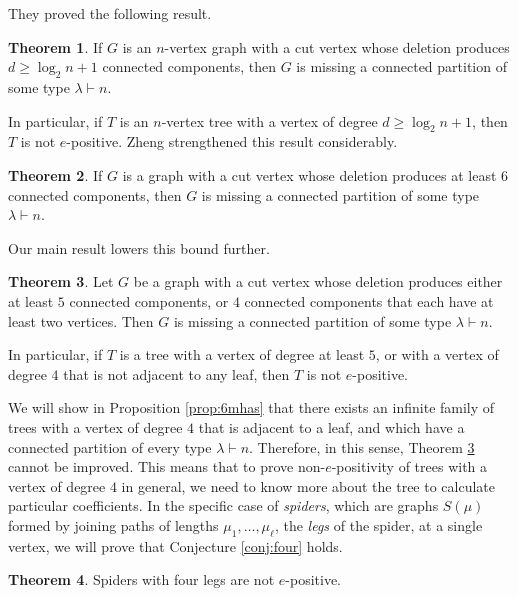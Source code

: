 \documentclass[12pt]{amsart}  %
\theoremstyle{definition}
\newtheorem{theorem}{Theorem}[section]
\theoremstyle{remark}
\numberwithin{equation}{section}
\begin{document}
They proved the following result. 

\begin{theorem}\cite[Theorem 4.1]{chromspostrees} If $G$ is an $n$-vertex graph with a cut vertex whose deletion produces $d\geq\log_2 n+1$ connected components, then $G$ is missing a connected partition of some type $\lambda\vdash n$.
\end{theorem}

In particular, if $T$ is an $n$-vertex tree with a vertex of degree $d\geq\log_2n+1$, then $T$ is not $e$-positive. Zheng strengthened this result considerably.

\begin{theorem}\cite[Theorem 3.13]{spiderepos} If $G$ is a graph with a cut vertex whose deletion produces at least $6$ connected components, then $G$ is missing a connected partition of some type $\lambda\vdash n$.
\end{theorem}

Our main result lowers this bound further.

\begin{theorem}\label{thm:main}
Let $G$ be a graph with a cut vertex whose deletion produces either at least $5$ connected components, or $4$ connected components that each have at least two vertices. Then $G$ is missing a connected partition of some type $\lambda\vdash n$.
\end{theorem}

In particular, if $T$ is a tree with a vertex of degree at least $5$, or with a vertex of degree $4$ that is not adjacent to any leaf, then $T$ is not $e$-positive.

We will show in Proposition \ref{prop:6mhas} that there exists an infinite family of trees with a vertex of degree $4$ that is adjacent to a leaf, and which have a connected partition of every type $\lambda\vdash n$. Therefore, in this sense, Theorem \ref{thm:main} cannot be improved. This means that to prove non-$e$-positivity of trees with a vertex of degree $4$ in general, we need to know more about the tree to calculate particular coefficients. In the specific case of \emph{spiders}, which are graphs $S(\mu)$ formed by joining paths of lengths $\mu_1,\ldots,\mu_\ell$, the \emph{legs} of the spider, at a single vertex, we will prove that Conjecture \ref{conj:four} holds.

\begin{theorem}\label{thm:spider4}
Spiders with four legs are not $e$-positive.
\end{theorem}
\end{document}
